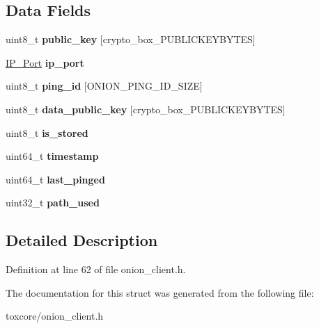 \subsection*{Data Fields}
\begin{DoxyCompactItemize}
\item 
\hypertarget{struct_onion___node_aaa806bb1136fb3d4b5d8d8970b596ff7}{uint8\+\_\+t {\bfseries public\+\_\+key} \mbox{[}crypto\+\_\+box\+\_\+\+P\+U\+B\+L\+I\+C\+K\+E\+Y\+B\+Y\+T\+E\+S\mbox{]}}\label{struct_onion___node_aaa806bb1136fb3d4b5d8d8970b596ff7}

\item 
\hypertarget{struct_onion___node_a86e2a5a56c0dd22df6e8b8a10e40f9e4}{\hyperlink{struct_i_p___port}{I\+P\+\_\+\+Port} {\bfseries ip\+\_\+port}}\label{struct_onion___node_a86e2a5a56c0dd22df6e8b8a10e40f9e4}

\item 
\hypertarget{struct_onion___node_aa21328f812472705a8d7bcee491bb54d}{uint8\+\_\+t {\bfseries ping\+\_\+id} \mbox{[}O\+N\+I\+O\+N\+\_\+\+P\+I\+N\+G\+\_\+\+I\+D\+\_\+\+S\+I\+Z\+E\mbox{]}}\label{struct_onion___node_aa21328f812472705a8d7bcee491bb54d}

\item 
\hypertarget{struct_onion___node_add8f6d39a7818b6d3ff0fca42a0aadf4}{uint8\+\_\+t {\bfseries data\+\_\+public\+\_\+key} \mbox{[}crypto\+\_\+box\+\_\+\+P\+U\+B\+L\+I\+C\+K\+E\+Y\+B\+Y\+T\+E\+S\mbox{]}}\label{struct_onion___node_add8f6d39a7818b6d3ff0fca42a0aadf4}

\item 
\hypertarget{struct_onion___node_ada3701a9ce02699f1b7e8f55a41379bf}{uint8\+\_\+t {\bfseries is\+\_\+stored}}\label{struct_onion___node_ada3701a9ce02699f1b7e8f55a41379bf}

\item 
\hypertarget{struct_onion___node_a465bef81f6478756e5443025b1f2ddfa}{uint64\+\_\+t {\bfseries timestamp}}\label{struct_onion___node_a465bef81f6478756e5443025b1f2ddfa}

\item 
\hypertarget{struct_onion___node_a4049204f6c392628d31be6c39f03e031}{uint64\+\_\+t {\bfseries last\+\_\+pinged}}\label{struct_onion___node_a4049204f6c392628d31be6c39f03e031}

\item 
\hypertarget{struct_onion___node_a75c3cb4fcbcf13c47379cc14737926d9}{uint32\+\_\+t {\bfseries path\+\_\+used}}\label{struct_onion___node_a75c3cb4fcbcf13c47379cc14737926d9}

\end{DoxyCompactItemize}


\subsection{Detailed Description}


Definition at line 62 of file onion\+\_\+client.\+h.



The documentation for this struct was generated from the following file\+:\begin{DoxyCompactItemize}
\item 
toxcore/onion\+\_\+client.\+h\end{DoxyCompactItemize}
